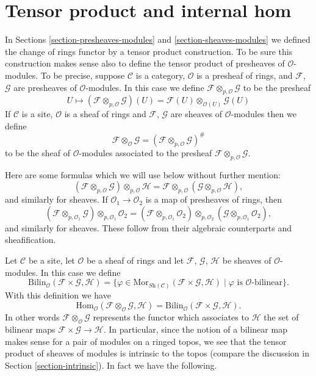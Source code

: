 \section{Tensor product and internal hom}
\label{section-tensor-and-internal-hom}

\noindent
In Sections \ref{section-presheaves-modules} and
\ref{section-sheaves-modules}
we defined the change of rings functor by a tensor
product construction. To be sure this construction makes sense also
to define the tensor product of presheaves of $\mathcal{O}$-modules.
To be precise, suppose $\mathcal{C}$ is a category,
$\mathcal{O}$ is a presheaf of rings, and $\mathcal{F}$, $\mathcal{G}$
are presheaves of $\mathcal{O}$-modules. In this case we define
$\mathcal{F} \otimes_{p, \mathcal{O}} \mathcal{G}$ to be the presheaf
$$
U
\longmapsto
(\mathcal{F} \otimes_{p, \mathcal{O}} \mathcal{G})(U)
=
\mathcal{F}(U) \otimes_{\mathcal{O}(U)} \mathcal{G}(U)
$$
If $\mathcal{C}$ is a site, $\mathcal{O}$ is a sheaf of rings and
$\mathcal{F}$, $\mathcal{G}$ are sheaves of $\mathcal{O}$-modules
then we define
$$
\mathcal{F} \otimes_{\mathcal{O}} \mathcal{G}
=
(\mathcal{F} \otimes_{p, \mathcal{O}} \mathcal{G})^\#
$$
to be the sheaf of $\mathcal{O}$-modules associated to the presheaf
$\mathcal{F} \otimes_{p, \mathcal{O}} \mathcal{G}$.

\medskip\noindent
Here are some formulas which we will use below without further mention:
$$
(\mathcal{F}
\otimes_{p, \mathcal{O}} \mathcal{G})
\otimes_{p, \mathcal{O}} \mathcal{H}
=
\mathcal{F}
\otimes_{p, \mathcal{O}} (\mathcal{G}
\otimes_{p, \mathcal{O}} \mathcal{H}),
$$
and similarly for sheaves.
If $\mathcal{O}_1 \to \mathcal{O}_2$ is a map of presheaves of rings,
then
$$
(\mathcal{F} \otimes_{p, \mathcal{O}_1} \mathcal{G})
\otimes_{p, \mathcal{O}_1} \mathcal{O}_2 =
(\mathcal{F} \otimes_{p, \mathcal{O}_1} \mathcal{O}_2)
\otimes_{p, \mathcal{O}_2}
(\mathcal{G} \otimes_{p, \mathcal{O}_1} \mathcal{O}_2),
$$
and similarly for sheaves.
These follow from their algebraic counterparts and sheafification.

\medskip\noindent
Let $\mathcal{C}$ be a site, let $\mathcal{O}$ be a sheaf of rings and let
$\mathcal{F}$, $\mathcal{G}$, $\mathcal{H}$ be sheaves of
$\mathcal{O}$-modules. In this case we define
$$
\text{Bilin}_{\mathcal{O}}(\mathcal{F} \times \mathcal{G}, \mathcal{H})
=
\{\varphi \in
\text{Mor}_{\textit{Sh}(\mathcal{C})}(
\mathcal{F} \times \mathcal{G}, \mathcal{H}) \mid
\varphi \text{ is }\mathcal{O}\text{-bilinear}\}.
$$
With this definition we have
$$
\text{Hom}_{\mathcal{O}}
(\mathcal{F} \otimes_{\mathcal{O}} \mathcal{G}, \mathcal{H})
=
\text{Bilin}_{\mathcal{O}}(\mathcal{F} \times \mathcal{G}, \mathcal{H}).
$$
In other words $\mathcal{F} \otimes_{\mathcal{O}} \mathcal{G}$
represents the functor which associates to $\mathcal{H}$ the set
of bilinear maps $\mathcal{F} \times \mathcal{G} \to \mathcal{H}$.
In particular, since the notion of a bilinear map makes sense for
a pair of modules on a ringed topos, we see that the tensor
product of sheaves of modules is intrinsic to the topos (compare
the discussion in Section \ref{section-intrinsic}). In fact we
have the following.

